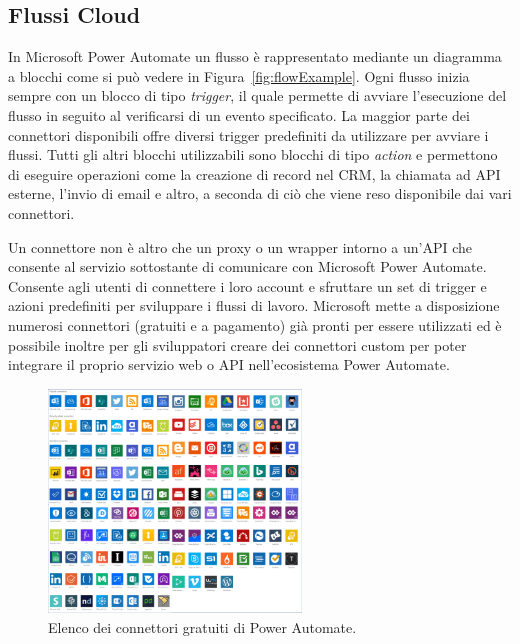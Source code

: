 \subsection{Flussi Cloud}
In Microsoft Power Automate un flusso è rappresentato mediante un diagramma a blocchi come si può vedere in Figura~\ref{fig:flowExample}. Ogni flusso inizia sempre con un blocco di tipo \textit{trigger}, il quale permette di avviare l'esecuzione del flusso in seguito al verificarsi di un evento specificato. La maggior parte dei connettori disponibili offre diversi trigger predefiniti da utilizzare per avviare i flussi. Tutti gli altri blocchi utilizzabili sono blocchi di tipo \textit{action} e permettono di eseguire operazioni come la creazione di record nel CRM, la chiamata ad API esterne, l'invio di email e altro, a seconda di ciò che viene reso disponibile dai vari connettori.

Un connettore non è altro che un proxy o un wrapper intorno a un'API che consente al servizio sottostante di comunicare con Microsoft Power Automate. Consente agli utenti di connettere i loro account e sfruttare un set di trigger e azioni predefiniti per sviluppare i flussi di lavoro. Microsoft mette a disposizione numerosi connettori (gratuiti e a pagamento) già pronti per essere utilizzati ed è possibile inoltre per gli sviluppatori creare dei connettori custom per poter integrare il proprio servizio web o API nell'ecosistema Power Automate.

\begin{figure}[ht!]
  \centering
  \includegraphics[width=0.6\textwidth]{connectors.png}
  \caption{Elenco dei connettori gratuiti di Power Automate.}
  \label{fig:connectors}
\end{figure}

